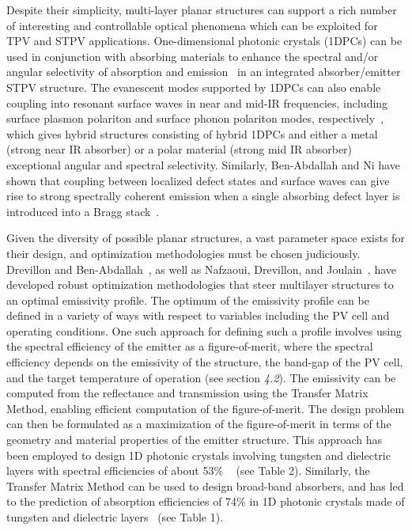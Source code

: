 \documentclass[10pt,letterpaper]{article}
\begin{document}
Despite their simplicity, multi-layer planar structures can support a rich number of interesting and controllable optical phenomena
which can be exploited for TPV and STPV applications.  One-dimensional photonic crystals (1DPCs) can be used in conjunction with absorbing
materials to enhance the spectral and/or angular selectivity of absorption and emission~\cite{paper1_ref4} in an integrated absorber/emitter STPV
structure.  The evanescent modes supported by 1DPCs
can also enable coupling into resonant surface waves in near and mid-IR frequencies, including surface plasmon polariton and surface
phonon polariton modes, respectively~\cite{LZ_JApplPhys_2006}, which gives hybrid 
structures consisting of hybrid 1DPCs and either a metal (strong near IR
absorber) or a polar material (strong mid IR absorber) 
exceptional angular and spectral selectivity.  Similarly, Ben-Abdallah and Ni have shown that coupling
between localized defect states and surface waves can give rise to strong spectrally coherent emission when a single absorbing defect layer is
introduced into a Bragg stack~\cite{BN_JApplPhys_2005}. 

Given the diversity of possible planar structures, a vast parameter space exists for their design, and optimization methodologies must
be chosen judiciously.  Drevillon and Ben-Abdallah~\cite{DB_JApplPhys_2007}, as well as Nafzaoui, Drevillon, and Joulain~\cite{NDJ_JApplPhys_2012},
have developed robust optimization 
methodologies that steer multilayer structures to an optimal emissivity profile. The optimum of the emissivity
profile can be defined in a variety of ways with respect to variables including the PV cell and operating conditions.
One such approach for defining such a profile involves using the spectral efficiency of the emitter as a figure-of-merit,
where the spectral efficiency depends on the emissivity of the structure, the band-gap of the PV cell, and the target 
temperature of operation (see section {\it 4.2}).  
The emissivity can be computed from the reflectance
and transmission using the Transfer Matrix Method, enabling efficient computation of the figure-of-merit.  The design problem can then be
formulated as a maximization of the figure-of-merit in terms of the geometry and material properties of the emitter structure.
This approach has been employed to design 1D photonic crystals involving tungsten and dielectric layers with spectral efficiencies of 
about 53\% ~\cite{SKY_JPE_2015} (see Table 2).  Similarly, the Transfer 
Matrix Method can be used to design broad-band absorbers, 
and has led to the prediction of 
absorption efficiencies of 74\% in 1D photonic crystals made of tungsten 
and dielectric layers~\cite{SKY_JPE_2015} (see Table 1).
\end{document}
